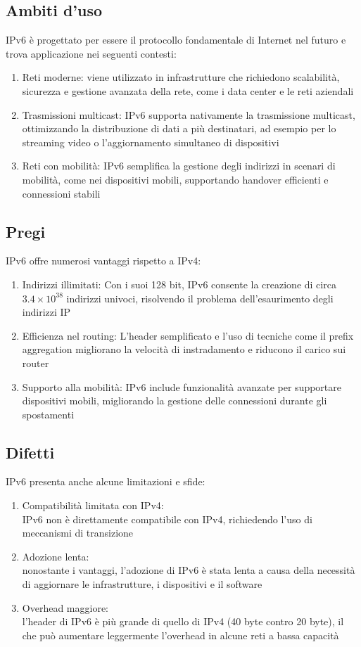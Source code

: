 \documentclass[10pt,oneside,a4paper]{article}
\begin{document}
\subsection{Ambiti d'uso}
IPv6 è progettato per essere il protocollo fondamentale di Internet nel futuro e trova applicazione nei seguenti contesti:
\begin{enumerate}
\item Reti moderne: viene utilizzato in infrastrutture che richiedono scalabilità, sicurezza e gestione avanzata della rete, come i data center e le reti aziendali
\item Trasmissioni multicast: IPv6 supporta nativamente la trasmissione multicast, ottimizzando la distribuzione di dati a più destinatari, ad esempio per lo streaming video o l'aggiornamento simultaneo di dispositivi
\item Reti con mobilità: IPv6 semplifica la gestione degli indirizzi in scenari di mobilità, come nei dispositivi mobili, supportando handover efficienti e connessioni stabili
\end{enumerate}
\subsection{Pregi}
IPv6 offre numerosi vantaggi rispetto a IPv4:
\begin{enumerate}
\item Indirizzi illimitati: Con i suoi 128 bit, IPv6 consente la creazione di circa $3.4 \times 10^{38}$ indirizzi univoci, risolvendo il problema dell'esaurimento degli indirizzi IP
\item Efficienza nel routing: L'header semplificato e l'uso di tecniche come il prefix aggregation migliorano la velocità di instradamento e riducono il carico sui router
\item Supporto alla mobilità: IPv6 include funzionalità avanzate per supportare dispositivi mobili, migliorando la gestione delle connessioni durante gli spostamenti
\end{enumerate}
\subsection{Difetti}
IPv6 presenta anche alcune limitazioni e sfide:
\begin{enumerate}
\item Compatibilità limitata con IPv4:\\
IPv6 non è direttamente compatibile con IPv4, richiedendo l'uso di meccanismi di transizione
\item Adozione lenta:\\
nonostante i vantaggi, l'adozione di IPv6 è stata lenta a causa della necessità di aggiornare le infrastrutture, i dispositivi e il software
\item Overhead maggiore:\\
l'header di IPv6 è più grande di quello di IPv4 (40 byte contro 20 byte), il che può aumentare leggermente l'overhead in alcune reti a bassa capacità
\end{enumerate}
\end{document}
